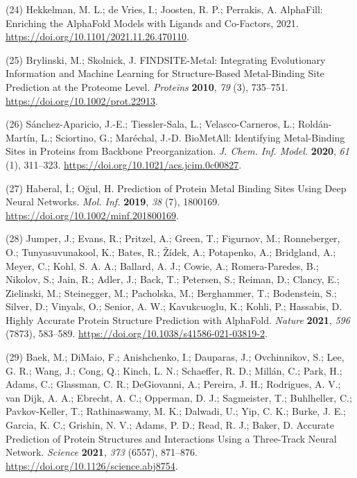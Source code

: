 \documentclass[  ASAPversion,
  ,
  9pt]{elife}
\newenvironment{cslreferences}%
  {}%
  {\par}
\begin{document}
\begin{cslreferences}
\leavevmode\hypertarget{ref-13fLqNwbD}{}%
(24) Hekkelman, M. L.; de Vries, I.; Joosten, R. P.; Perrakis, A. AlphaFill: Enriching the AlphaFold Models with Ligands and Co-Factors, 2021. \url{https://doi.org/10.1101/2021.11.26.470110}.

\leavevmode\hypertarget{ref-W4f7UG1p}{}%
(25) Brylinski, M.; Skolnick, J. FINDSITE-Metal: Integrating Evolutionary Information and Machine Learning for Structure-Based Metal-Binding Site Prediction at the Proteome Level. \emph{Proteins} \textbf{2010}, \emph{79} (3), 735--751. \url{https://doi.org/10.1002/prot.22913}.

\leavevmode\hypertarget{ref-iHxzzTCG}{}%
(26) Sánchez-Aparicio, J.-E.; Tiessler-Sala, L.; Velasco-Carneros, L.; Roldán-Martín, L.; Sciortino, G.; Maréchal, J.-D. BioMetAll: Identifying Metal-Binding Sites in Proteins from Backbone Preorganization. \emph{J. Chem. Inf. Model.} \textbf{2020}, \emph{61} (1), 311--323. \url{https://doi.org/10.1021/acs.jcim.0c00827}.

\leavevmode\hypertarget{ref-13sNVOrHB}{}%
(27) Haberal, İ.; Oğul, H. Prediction of Protein Metal Binding Sites Using Deep Neural Networks. \emph{Mol. Inf.} \textbf{2019}, \emph{38} (7), 1800169. \url{https://doi.org/10.1002/minf.201800169}.

\leavevmode\hypertarget{ref-yZfcMIwh}{}%
(28) Jumper, J.; Evans, R.; Pritzel, A.; Green, T.; Figurnov, M.; Ronneberger, O.; Tunyasuvunakool, K.; Bates, R.; Žídek, A.; Potapenko, A.; Bridgland, A.; Meyer, C.; Kohl, S. A. A.; Ballard, A. J.; Cowie, A.; Romera-Paredes, B.; Nikolov, S.; Jain, R.; Adler, J.; Back, T.; Petersen, S.; Reiman, D.; Clancy, E.; Zielinski, M.; Steinegger, M.; Pacholska, M.; Berghammer, T.; Bodenstein, S.; Silver, D.; Vinyals, O.; Senior, A. W.; Kavukcuoglu, K.; Kohli, P.; Hassabis, D. Highly Accurate Protein Structure Prediction with AlphaFold. \emph{Nature} \textbf{2021}, \emph{596} (7873), 583--589. \url{https://doi.org/10.1038/s41586-021-03819-2}.

\leavevmode\hypertarget{ref-rnu2o8C9}{}%
(29) Baek, M.; DiMaio, F.; Anishchenko, I.; Dauparas, J.; Ovchinnikov, S.; Lee, G. R.; Wang, J.; Cong, Q.; Kinch, L. N.; Schaeffer, R. D.; Millán, C.; Park, H.; Adams, C.; Glassman, C. R.; DeGiovanni, A.; Pereira, J. H.; Rodrigues, A. V.; van Dijk, A. A.; Ebrecht, A. C.; Opperman, D. J.; Sagmeister, T.; Buhlheller, C.; Pavkov-Keller, T.; Rathinaswamy, M. K.; Dalwadi, U.; Yip, C. K.; Burke, J. E.; Garcia, K. C.; Grishin, N. V.; Adams, P. D.; Read, R. J.; Baker, D. Accurate Prediction of Protein Structures and Interactions Using a Three-Track Neural Network. \emph{Science} \textbf{2021}, \emph{373} (6557), 871--876. \url{https://doi.org/10.1126/science.abj8754}.


\end{cslreferences}
\end{document}
